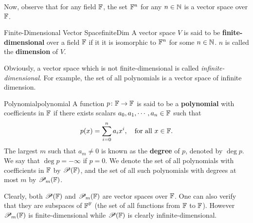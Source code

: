 \documentclass[math]{amznotes}
\theoremstyle{remark}
\begin{document}
Now, observe that for any field $\mathbb{F}$, the set $\mathbb{F}^n$ for any $n \in \mathbb{N}$ is a vector space over $\mathbb{F}$.
\begin{dfnbox}{Finite-Dimensional Vector Space}{finiteDim}
    A vector space $V$ is said to be {\color{red} \textbf{finite-dimensional}} over a field $\mathbb{F}$ if it it is isomorphic to $\mathbb{F}^n$ for some $n \in \mathbb{N}$. $n$ is called the {\color{red} \textbf{dimension}} of $V$.
\end{dfnbox}
Obviously, a vector space which is not finite-dimensional is called \textit{infinite-dimensional}. For example, the set of all polynomials is a vector space of infinite dimension.
\begin{dfnbox}{Polynomial}{polynomial}
    A function $p \colon \mathbb{F} \to \mathbb{F}$ is said to be a {\color{red} \textbf{polynomial}} with coefficients in $\mathbb{F}$ if there exists scalars $a_0, a_1, \cdots, a_n \in \mathbb{F}$ such that 
    \begin{equation*}
        p(x) = \sum_{i = 0}^{n}a_ix^i, \quad\textrm{for all } x \in \mathbb{F}.
    \end{equation*}
    The largest $m$ such that $a_m \neq 0$ is known as the {\color{red} \textbf{degree}} of $p$, denoted by $\deg p$. We say that $\deg p = -\infty$ if $p = 0$. We denote the set of all polynomials with coefficients in $\mathbb{F}$ by $\mathscr{P}(\mathbb{F})$, and the set of all such polynomials with degrees at most $m$ by $\mathscr{P}_m(\mathbb{F})$.
\end{dfnbox}
Clearly, both $\mathscr{P}(\mathbb{F})$ and $\mathscr{P}_m(\mathbb{F})$ are vector spaces over $\mathbb{F}$. One can also verify that they are subspaces of $\mathbb{F}^{\mathbb{F}}$ (the set of all functions from $\mathbb{F}$ to $\mathbb{F}$). However $\mathscr{P}_m(\mathbb{F})$ is finite-dimensional while $\mathscr{P}(\mathbb{F})$ is clearly infinite-dimensional.
\end{document}
